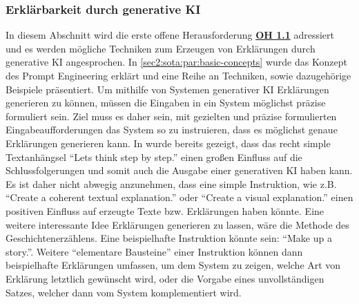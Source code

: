 \subsubsection{Erklärbarkeit durch generative KI}
\label{sec3:model:subsubsec:explainability-through-genai}
In diesem Abschnitt wird die erste offene Herausforderung \hyperref[sec2:sota:oi:1.1]{\textbf{OH 1.1}} adressiert und es werden mögliche Techniken zum Erzeugen von Erklärungen durch generative KI angesprochen.
In \cref{sec2:sota:par:basic-concepts} wurde das Konzept des Prompt Engineering erklärt und eine Reihe an Techniken, sowie dazugehörige Beispiele präsentiert.
Um mithilfe von Systemen generativer KI Erklärungen generieren zu können, müssen die Eingaben in ein System möglichst präzise formuliert sein.
Ziel muss es daher sein, mit gezielten und präzise formulierten Eingabeaufforderungen das System so zu instruieren, dass es möglichst genaue Erklärungen generieren kann.
In \cite{zero-shot-reasoners} wurde bereits gezeigt, dass das recht simple Textanhängsel \enquote{Lets think step by step.} einen großen Einfluss auf die Schlussfolgerungen und somit auch die Ausgabe einer generativen KI haben kann.
Es ist daher nicht abwegig anzunehmen, dass eine simple Instruktion, wie z.B. \enquote{Create a coherent textual explanation.} oder \enquote{Create a visual explanation.} einen positiven Einfluss auf erzeugte Texte bzw. Erklärungen haben könnte.
Eine weitere interessante Idee Erklärungen generieren zu lassen, wäre die Methode des Geschichtenerzählens.
Eine beispielhafte Instruktion könnte sein: \enquote{Make up a story.}.
Weitere \enquote{elementare Bausteine} einer Instruktion können dann beispielhafte Erklärungen umfassen, um dem System zu zeigen, welche Art von Erklärung letztlich gewünscht wird, oder die Vorgabe eines unvollständigen Satzes, welcher dann vom System komplementiert wird.

